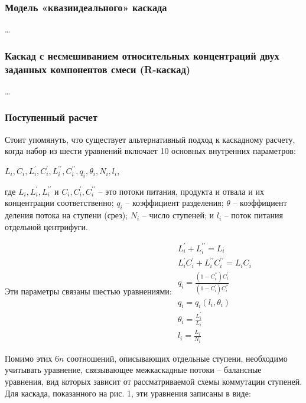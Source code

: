 \subsubsection{Модель «квазиидеального» каскада}
\dots

\subsubsection{Каскад с несмешиванием относительных концентраций двух заданных компонентов смеси (R-каскад)}
\dots

\subsubsection{Поступенный расчет}

Стоит упомянуть, что существует альтернативный подход к каскадному расчету, когда набор из шести уравнений включает 10 основных внутренних параметров:

$L_{i}, C_{i}, L_{i}^{\prime}, C_{i}^{\prime}, L_{i}^{\prime \prime}, C_{i}^{\prime \prime}, q_{i}, \theta_{i}, N_{i}, l_{i}$,

где $L_{i}, L_{i}^{\prime}, L_{i}^{\prime \prime}$ и $C_{i}, C_{i}^{\prime}, C_{i}^{\prime \prime}$ -- 
это потоки питания, продукта и отвала и их концентрации соответственно; $q_{i}$ -- коэффициент разделения; $\theta$ -- коэффициент деления потока на ступени (срез); $N_{i}$ -- число ступеней; и $l_{i}$ -- поток питания отдельной центрифуги.

Эти параметры связаны шестью уравнениями:
$\begin{array}{c}
  {L_{i}^{\prime}+L_{i}^{\prime \prime}=L_{i}} \\
  {L_{i}^{\prime} C_{i}^{\prime}+L_{i}^{\prime \prime} C_{i}^{\prime \prime}=L_{i} C_{i}} \\
  {q_{i}=\frac{(1-C_{i}^{\prime \prime}) C_{i}^{\prime}}{(1-C_{i}^{\prime}) C_{i}^{\prime \prime}}} \\
  {q_{i}=q_{i}\left(l_{i}, \theta_{i}\right)} \\
  {\theta_{i}=\frac{L_{i}^{\prime}}{L_{i}}} \\
  {l_{i}=\frac{L_{i}}{N_{i}}}
\end{array}$

Помимо этих 6$n$ соотношений, описывающих отдельные ступени, необходимо учитывать уравнение, связывающее межкаскадные потоки -- балансные уравнения, вид которых зависит от рассматриваемой схемы коммутации ступеней. Для каскада, показанного на рис. 1, эти уравнения записаны в виде:

